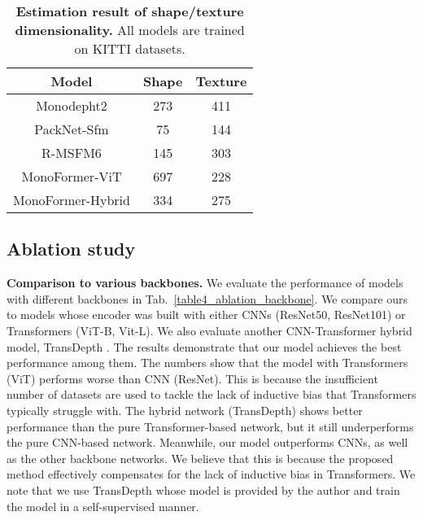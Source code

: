 \documentclass[letterpaper]{article} \usepackage{aaai23}  \usepackage{times}  \usepackage{helvet}  \usepackage{courier}  \usepackage[hyphens]{url}  \usepackage{graphicx} \urlstyle{rm} \def\UrlFont{\rm}  \usepackage{natbib}  \usepackage{caption} \frenchspacing  \setlength{\pdfpagewidth}{8.5in} \setlength{\pdfpageheight}{11in} \usepackage{algorithm}
\newcommand{\tabref}[1]{Tab.~\ref{#1}}
\begin{document}
\begin{table}[t]
\centering
\begin{tabular}{c|cc}
\hline
        Model & Shape & Texture \\ \hline
        Monodepht2 & 273 & 411 \\ \hline
        PackNet-Sfm & 75 & 144 \\ \hline
        R-MSFM6 & 145 & 303 \\ \hline
        MonoFormer-ViT & 697 & 228  \\ \hline
        MonoFormer-Hybrid & 334 & 275 \\ \hline
\end{tabular}
\caption{\textbf{Estimation result of shape/texture dimensionality.} All models are trained on KITTI datasets.}
\label{shape-texture-est}
\end{table}

\subsection{Ablation study}
 
\noindent \textbf{Comparison to various backbones.} We evaluate the performance of models with different backbones in \tabref{table4_ablation_backbone}. We compare ours to models whose encoder was built with either CNNs (ResNet50, ResNet101) or Transformers (ViT-B, Vit-L). We also evaluate another CNN-Transformer hybrid model, TransDepth \cite{yang2021transformer}. The results demonstrate that our model achieves the best performance among them. The numbers show that the model with Transformers (ViT) performs worse than CNN (ResNet). This is because the insufficient number of datasets are used to tackle the lack of inductive bias that Transformers typically struggle with.
The hybrid network (TransDepth) shows better performance than the pure Transformer-based network, but it still underperforms the pure CNN-based network. Meanwhile, our model outperforms CNNs, as well as the other backbone networks. We believe that this is because the proposed method effectively compensates for the lack of inductive bias in Transformers. We note that we use TransDepth whose model is provided by the author \cite{yang2021transformer} and train the model in a self-supervised manner.
\end{document}
